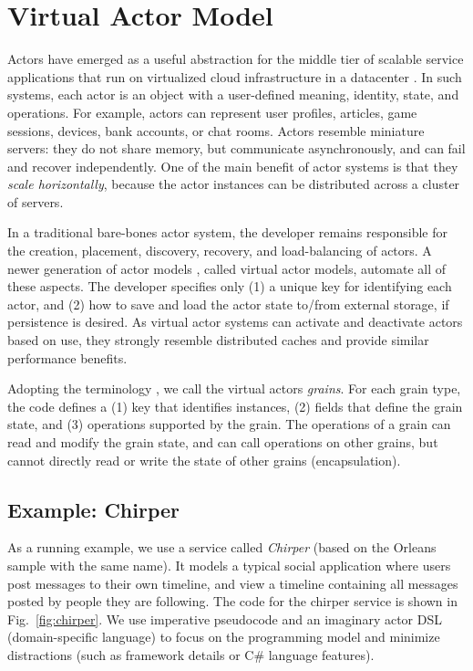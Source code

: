 \section{Virtual Actor Model}\label{sec:virtualactors}

Actors have emerged as a useful abstraction for the middle tier of scalable service applications that run on virtualized cloud infrastructure in a datacenter . In such systems, each actor is an object with a user-defined meaning, identity, state, and operations. For example, actors can represent user profiles, articles, game sessions, devices, bank accounts, or chat rooms. Actors resemble miniature servers: they do not share memory, but communicate asynchronously, and can fail and recover independently. One of the main benefit of actor systems is that they \emph{scale horizontally}, because the actor instances can be distributed across a cluster of servers.

In a traditional bare-bones actor system, the developer remains responsible for the creation, placement, discovery, recovery, and load-balancing of actors. A newer generation of actor models \cite{orleans,orbit,sfactors}, called virtual actor models, automate all of these aspects. The developer specifies only (1) a unique key for identifying each actor, and (2) how to save and load the actor state to/from external storage, if persistence is desired. As virtual actor systems can activate and deactivate actors based on use, they strongly resemble distributed caches \cite{memcached} and provide similar performance benefits. 

Adopting the terminology \cite{orleanstr,orleans-socc}, we call the virtual actors \emph{grains}. For each grain type, the code defines a (1) key that identifies instances, (2)  fields that define the grain state, and (3) operations supported by the grain. The operations of a grain can read and modify the grain state, and can call operations on other grains, but cannot directly read or write the state of other grains (encapsulation). 
 
\subsection{Example: Chirper}

As a running example, we use a service called \emph{Chirper} (based on the Orleans sample with the same name). It models a typical social application where users post messages to their own timeline, and view a timeline containing all messages posted by people they are following.
The code for the chirper service is shown in Fig.~\ref{fig:chirper}. We use imperative pseudocode and an imaginary actor DSL (domain-specific language) to focus on the programming model and minimize distractions (such as framework details or C\# language features). 

